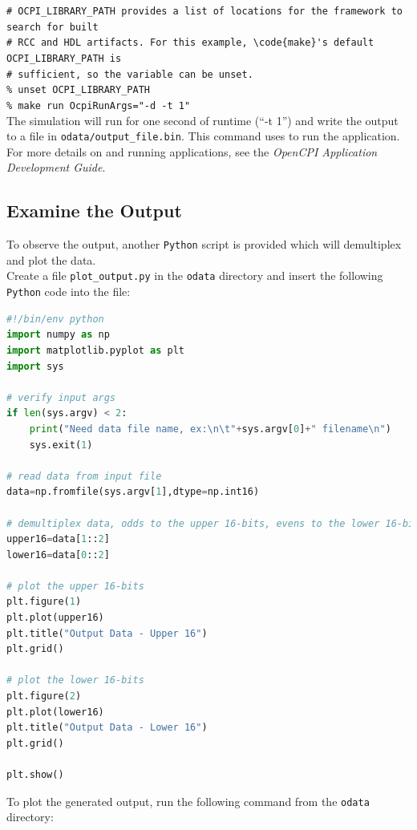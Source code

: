 \forceindent\verb+# OCPI_LIBRARY_PATH provides a list of locations for the framework to search for built+\\
\forceindent\verb+# RCC and HDL artifacts. For this example, \code{make}'s default OCPI_LIBRARY_PATH is+\\
\forceindent\verb+# sufficient, so the variable can be unset.+\\
\forceindent\verb+% unset OCPI_LIBRARY_PATH+   \\
\forceindent\verb+% make run OcpiRunArgs="-d -t 1"+\\
\bend
The simulation will run for one second of runtime (``-t 1'') and write the output to a file in \verb+odata/output_file.bin+.
This  command uses  to run the application. For more details on  and running applications, see the \textit{OpenCPI Application Development Guide}.

\subsection{Examine the Output}
To observe the output, another \verb+Python+ script is provided which will demultiplex and plot the data.\\
\bstart
Create a file \verb+plot_output.py+ in the \verb+odata+ directory and insert the following \verb+Python+ code into the file:
\begin{lstlisting}[language=python]
#!/bin/env python
import numpy as np
import matplotlib.pyplot as plt
import sys

# verify input args
if len(sys.argv) < 2:
    print("Need data file name, ex:\n\t"+sys.argv[0]+" filename\n")
    sys.exit(1)

# read data from input file
data=np.fromfile(sys.argv[1],dtype=np.int16)

# demultiplex data, odds to the upper 16-bits, evens to the lower 16-bits
upper16=data[1::2]
lower16=data[0::2]

# plot the upper 16-bits
plt.figure(1)
plt.plot(upper16)
plt.title("Output Data - Upper 16")
plt.grid()

# plot the lower 16-bits
plt.figure(2)
plt.plot(lower16)
plt.title("Output Data - Lower 16")
plt.grid()

plt.show()
\end{lstlisting}
\bend
\bstart
To plot the generated output, run the following command from the \verb+odata+ directory:\\

